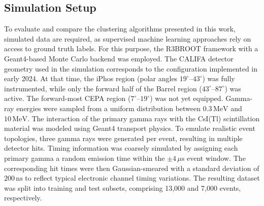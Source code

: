 \documentclass[final,5p,times,twocolumn]{elsarticle}
\begin{document}
\subsection{Simulation Setup}\label{s_sec:data_sim}
To evaluate and compare the clustering algorithms presented in this work, simulated data are required, as supervised machine learning approaches rely on access to ground truth labels. For this purpose, the R3BROOT framework with a Geant4-based Monte Carlo backend was employed.\newline
The CALIFA detector geometry used in the simulation corresponds to the configuration implemented in early 2024. At that time, the iPhos region (polar angles $19^\circ$–$43^\circ$) was fully instrumented, while only the forward half of the Barrel region ($43^\circ$–$87^\circ$) was active. The forward-most CEPA region ($7^\circ$–$19^\circ$) was not yet equipped.\newline
Gamma-ray energies were sampled from a uniform distribution between $0.3\,\mathrm{MeV}$ and $10\,\mathrm{MeV}$. The interaction of the primary gamma rays with the CsI(Tl) scintillation material was modeled using Geant4 transport physics.\newline
To emulate realistic event topologies, three gamma rays were generated per event, resulting in multiple detector hits. Timing information was coarsely simulated by assigning each primary gamma a random emission time within the $\pm 4\,\mu\mathrm{s}$ event window. The corresponding hit times were then Gaussian-smeared with a standard deviation of $200\,\mathrm{ns}$ to reflect typical electronic channel timing variations.\newline
The resulting dataset was split into training and test subsets, comprising 13{,}000 and 7{,}000 events, respectively.
\end{document}
